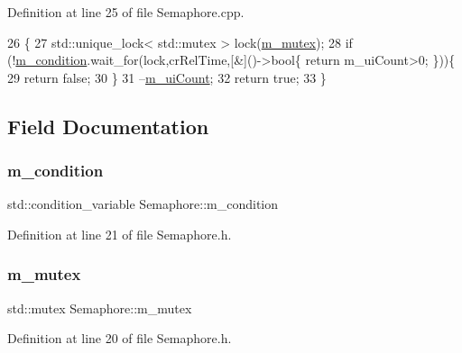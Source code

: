 Definition at line 25 of file Semaphore.\+cpp.


\begin{DoxyCode}
26 \{
27       std::unique\_lock< std::mutex > lock(\hyperlink{classSemaphore_a6490f302f311da3ce373a81672673296}{m\_mutex});
28       \textcolor{keywordflow}{if} (!\hyperlink{classSemaphore_a2b04d3a53f1fc1a13d7ed5d19d9e2be9}{m\_condition}.wait\_for(lock,crRelTime,[&]()->bool\{ return m\_uiCount>0; \}))\{
29       \textcolor{keywordflow}{return} \textcolor{keyword}{false};
30       \}
31       --\hyperlink{classSemaphore_a1456f105008b0c309f41211afbdd5fee}{m\_uiCount};
32       \textcolor{keywordflow}{return} \textcolor{keyword}{true};
33 \}
\end{DoxyCode}


\subsection{Field Documentation}
\mbox{\label{classSemaphore_a2b04d3a53f1fc1a13d7ed5d19d9e2be9}} 
\subsubsection{\texorpdfstring{m\+\_\+condition}{m\_condition}}
{\footnotesize\ttfamily std\+::condition\+\_\+variable Semaphore\+::m\+\_\+condition\hspace{0.3cm}{\ttfamily [private]}}



Definition at line 21 of file Semaphore.\+h.

\mbox{\label{classSemaphore_a6490f302f311da3ce373a81672673296}} 
\subsubsection{\texorpdfstring{m\+\_\+mutex}{m\_mutex}}
{\footnotesize\ttfamily std\+::mutex Semaphore\+::m\+\_\+mutex\hspace{0.3cm}{\ttfamily [private]}}



Definition at line 20 of file Semaphore.\+h.

\mbox{\label{classSemaphore_a1456f105008b0c309f41211afbdd5fee}} 
